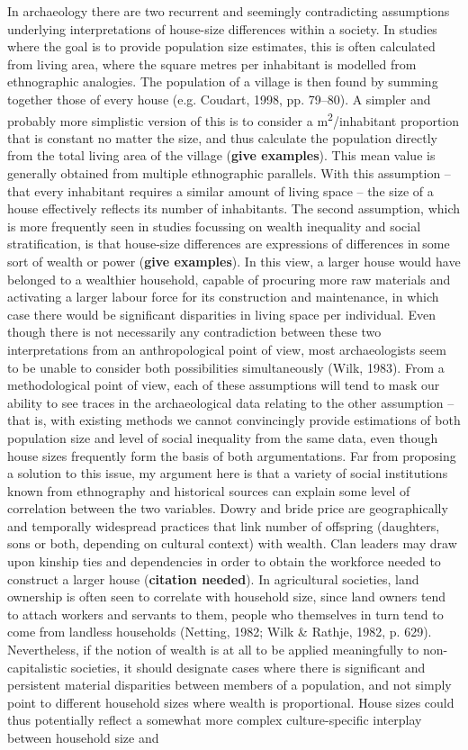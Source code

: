\documentclass[
  12pt,
]{book}
\begin{document}
In archaeology there are two recurrent and seemingly contradicting assumptions underlying interpretations of house-size differences within a society. In studies where the goal is to provide population size estimates, this is often calculated from living area, where the square metres per inhabitant is modelled from ethnographic analogies. The population of a village is then found by summing together those of every house (e.g. Coudart, 1998, pp. 79--80). A simpler and probably more simplistic version of this is to consider a m\textsuperscript{2}/inhabitant proportion that is constant no matter the size, and thus calculate the population directly from the total living area of the village (\textbf{give examples}). This mean value is generally obtained from multiple ethnographic parallels. With this assumption -- that every inhabitant requires a similar amount of living space -- the size of a house effectively reflects its number of inhabitants. The second assumption, which is more frequently seen in studies focussing on wealth inequality and social stratification, is that house-size differences are expressions of differences in some sort of wealth or power (\textbf{give examples}). In this view, a larger house would have belonged to a wealthier household, capable of procuring more raw materials and activating a larger labour force for its construction and maintenance, in which case there would be significant disparities in living space per individual. Even though there is not necessarily any contradiction between these two interpretations from an anthropological point of view, most archaeologists seem to be unable to consider both possibilities simultaneously (Wilk, 1983). From a methodological point of view, each of these assumptions will tend to mask our ability to see traces in the archaeological data relating to the other assumption -- that is, with existing methods we cannot convincingly provide estimations of both population size and level of social inequality from the same data, even though house sizes frequently form the basis of both argumentations. Far from proposing a solution to this issue, my argument here is that a variety of social institutions known from ethnography and historical sources can explain some level of correlation between the two variables. Dowry and bride price are geographically and temporally widespread practices that link number of offspring (daughters, sons or both, depending on cultural context) with wealth. Clan leaders may draw upon kinship ties and dependencies in order to obtain the workforce needed to construct a larger house (\textbf{citation needed}). In agricultural societies, land ownership is often seen to correlate with household size, since land owners tend to attach workers and servants to them, people who themselves in turn tend to come from landless households (Netting, 1982; Wilk \& Rathje, 1982, p. 629). Nevertheless, if the notion of wealth is at all to be applied meaningfully to non-capitalistic societies, it should designate cases where there is significant and persistent material disparities between members of a population, and not simply point to different household sizes where wealth is proportional. House sizes could thus potentially reflect a somewhat more complex culture-specific interplay between household size and 
\end{document}
